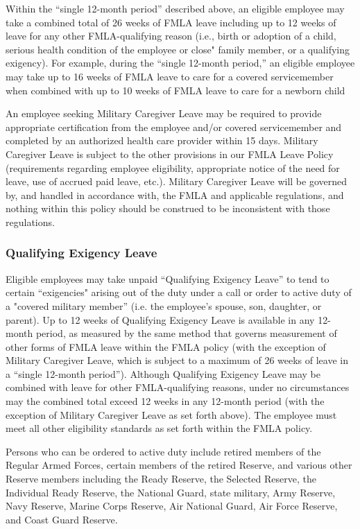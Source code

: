 Within the “single 12-month period” described above, an eligible employee may take a combined total of 26 weeks of FMLA leave including up to 12 weeks of leave for any other FMLA-qualifying reason (i.e., birth or adoption of a child, serious health condition of the employee or close" family member, or a qualifying exigency). For example, during the “single 12-month period,” an eligible employee may take up to 16 weeks of FMLA leave to care for a covered servicemember when combined with up to 10 weeks of FMLA leave to care for a newborn child

An employee seeking Military Caregiver Leave may be required to provide appropriate certification from the employee and/or covered servicemember and completed by an authorized health care provider within 15 days. Military Caregiver Leave is subject to the other provisions in our FMLA Leave Policy (requirements regarding employee eligibility, appropriate notice of the need for leave, use of accrued paid leave, etc.). Military Caregiver Leave will be governed by, and handled in accordance with, the FMLA and applicable regulations, and nothing within this policy should be construed to be inconsistent with those regulations.

\subsubsection{Qualifying Exigency Leave}

Eligible employees may take unpaid “Qualifying Exigency Leave” to tend to certain “exigencies" arising out of the duty under a call or order to active duty of a "covered military member” (i.e. the employee's spouse, son, daughter, or parent). Up to 12 weeks of Qualifying Exigency Leave is available in any 12-month period, as measured by the same method that governs measurement of other forms of FMLA leave within the FMLA policy (with the exception of Military Caregiver Leave, which is subject to a maximum of 26 weeks of leave in a “single 12-month period”). Although Qualifying Exigency Leave may be combined with leave for other FMLA-qualifying reasons, under no circumstances may the combined total exceed 12 weeks in any 12-month period (with the exception of Military Caregiver Leave as set forth above). The employee must meet all other eligibility standards as set forth within the FMLA policy.

Persons who can be ordered to active duty include retired members of the Regular Armed Forces, certain members of the retired Reserve, and various other Reserve members including the Ready Reserve, the Selected Reserve, the Individual Ready Reserve, the National Guard, state military, Army Reserve, Navy Reserve, Marine Corps Reserve, Air National Guard, Air Force Reserve, and Coast Guard Reserve.

